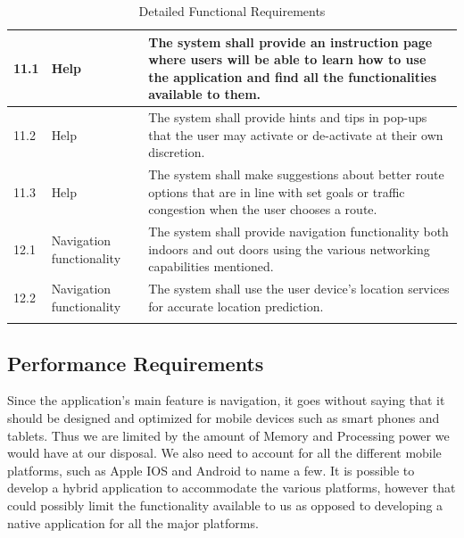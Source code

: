 \documentclass[12pt]{article}
\begin{document}
\begin{longtable}{|p{}| p{} | p{} |}
\hline

11.1& Help &The system shall provide an instruction page where users will be able to learn how to use the application and find all the functionalities available to them.\\

\hline

11.2& Help& The system shall provide hints and tips in pop-ups that the user may activate or de-activate at their own discretion.\\

\hline

11.3& Help& The system shall make suggestions about better route options that are in line with set goals or traffic congestion when the user chooses a route.\\

\hline

12.1 &Navigation functionality & The system shall provide navigation functionality both indoors and out doors using the various networking capabilities mentioned.\\

\hline

12.2&Navigation functionality &The system shall use the user device's location services for accurate location prediction.\\

\hline





\caption{Detailed Functional Requirements} %

\label{tab:NavUP Functional Requirements}

\end{longtable}






	\subsection{Performance Requirements}

	

	Since the application’s main feature is navigation, it goes without saying that it should be designed and optimized for mobile devices such as smart phones and tablets.  Thus we are limited by the amount of Memory and Processing power we would have at our disposal.  We also need to account for all the different mobile platforms, such as Apple IOS and Android to name a few.  It is possible to develop a hybrid application to accommodate the various platforms, however that could possibly limit the functionality available to us as opposed to developing a native application for all the major platforms.  
\end{document}
